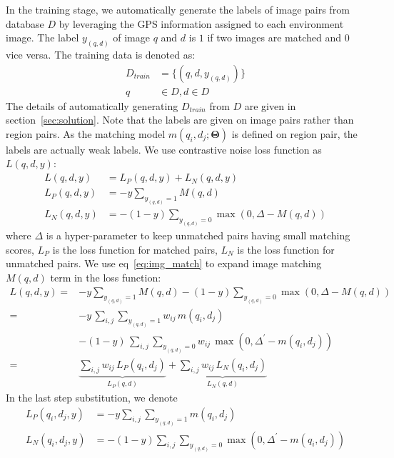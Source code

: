 In the training stage, we automatically generate the labels of image pairs from database $D$ by leveraging the GPS information assigned to each environment image. 
The label $y_{(q, d)}$ of image $q$ and $d$ is $1$ if two images are matched and $0$ vice versa. 
The training data is denoted as: 
\small
\begin{equation}
\begin{aligned}
D_{train} &= \{(q, d, y_{(q, d)})\}\\
q &\in D, d \in D
\end{aligned}
\end{equation}
\normalsize
The details of automatically generating $D_{train}$ from $D$ are given in section~\ref{sec:solution}. 
Note that the labels are given on image pairs rather than region pairs. 
As the matching model $m(q_i, d_j; \mathbf{\Theta})$ is defined on region pair, the labels are actually weak labels. 
We use contrastive noise loss function as $L(q, d, y)$:
\small
\begin{equation}
\label{eq:img_loss}
\begin{aligned}
L(q, d, y) &= L_P(q, d, y) + L_N(q, d, y) \\
L_P(q, d, y) &= -y\sum_{y_{(q, d)}=1} M(q, d)\\
L_N(q, d, y) &= -(1-y)\sum_{y_{(q, d)}=0} \max(0, \Delta-M(q,d))
\end{aligned}
\end{equation}
\normalsize
where $\Delta$ is a hyper-parameter to keep unmatched pairs having small matching scores, $L_P$ is the loss function for matched pairs, $L_N$ is the loss function for unmatched pairs. 
We use eq~\eqref{eq:img_match} to expand image matching $M(q, d)$ term in the loss function:
\small
\begin{equation}
\label{eq:region_loss}
\begin{aligned}
L(q, d, y) = &-y\sum_{y_{(q, d)}=1} M(q, d) - (1-y) \sum_{y_{(q, d)}=0} \max(0, \Delta - M(q, d))\\
= & -y\, \sum_{i, j}\sum_{y_{(q, d)}=1} w_{ij}\, m(q_i, d_j) \\
 &- (1-y)\, \sum_{i, j}\sum_{y_{(q, d)}=0} w_{ij}\, \max(0, \Delta^{'} - m(q_i, d_j))\\
= & \underbrace{\sum_{i, j} w_{ij}\, L_P(q_i, d_j)}_{L_P(q, d)} + \underbrace{\sum_{i,j} w_{ij}\, L_N(q_i, d_j)}_{L_N(q, d)}
\end{aligned}
\end{equation}
\normalsize
In the last step substitution, we denote
\small
\begin{equation}
\label{eq:correspondence}
\begin{aligned}
L_P(q_i, d_j, y) &= -y\sum_{i,j}\sum_{y_{(q, d)}=1} m(q_i, d_j)\\
L_N(q_i, d_j, y) &= -(1-y)\sum_{i,j}\sum_{y_{(q, d)}=0} \max(0, \Delta^{'} - m(q_i, d_j))
\end{aligned}
\end{equation}
